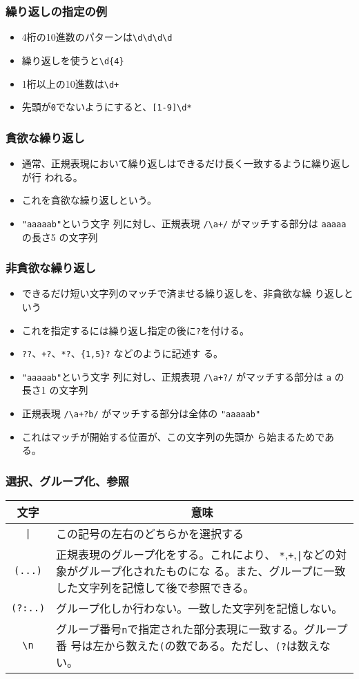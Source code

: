 \documentclass[dvipsk]{beamer}
\begin{document}
\begin{frame}[containsverbatim]
 \frametitle{繰り返しの指定の例}
\begin{itemize}
 \item 4桁の10進数のパターンは\verb+\d\d\d\d+
 \item 繰り返しを使うと\verb+\d{4}+
 \item 1桁以上の10進数は\verb-\d+-
 \item 先頭が\texttt{0}でないようにすると、\verb+[1-9]\d*+
\end{itemize}
\end{frame}
\begin{frame}[containsverbatim]
 \frametitle{貪欲な繰り返し}
\begin{itemize}
 \item 通常、正規表現において繰り返しはできるだけ長く一致するように繰り返しが行
われる。
 \item これを貪欲な繰り返しという。
 \item \verb+"aaaaab"+という文字
列に対し、正規表現 \verb-/\a+/- がマッチする部分は \verb+aaaaa+ の長さ5
の文字列
\end{itemize}
\end{frame}
\begin{frame}[containsverbatim]
 \frametitle{非貪欲な繰り返し}
\begin{itemize}
 \item できるだけ短い文字列のマッチで済ませる繰り返しを、非貪欲な繰
り返しという
 \item これを指定するには繰り返し指定の後に\verb+?+を付ける。
 \item \verb-??-、\verb-+?-、\verb-*?-、\verb-{1,5}?- などのように記述す
       る。
 \item \verb+"aaaaab"+という文字
列に対し、正規表現 \verb-/\a+?/- がマッチする部分は \verb+a+ の長さ1
の文字列
 \item 正規表現 \verb-/\a+?b/- がマッチする部分は全体の
\verb+"aaaaab"+
 \item これはマッチが開始する位置が、この文字列の先頭か
ら始まるためである。
\end{itemize}
\end{frame}
\begin{frame}[containsverbatim]
 \frametitle{選択、グループ化、参照}
\begin{center}
 \begin{tabular}{|c|m{}|}\hline
  文字&\multicolumn{1}{c|}{意味}\\\hline
\verb+|+&この記号の左右のどちらかを選択する\\\hline
\verb+(...)+&正規表現のグループ化をする。これにより、
      \verb-*-,\verb-+-,\verb-|-などの対象がグループ化されたものにな
      る。また、グループに一致した文字列を記憶して後で参照できる。\\\hline
\verb+(?:..)+&グループ化しか行わない。一致した文字列を記憶しない。\\\hline
\verb+\n+&グループ番号\verb+n+で指定された部分表現に一致する。グループ番
      号は左から数えた\verb+(+の数である。ただし、\verb+(?+は数えない。\\\hline
\end{tabular}
\end{center}
\end{frame}
\end{document}
